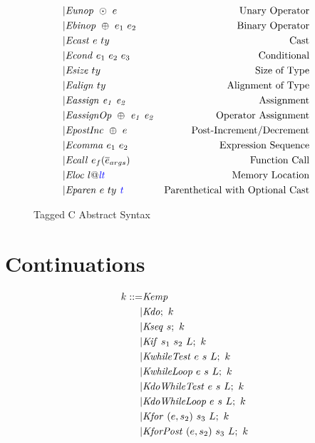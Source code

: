 \documentclass{llncs}
\begin{document}
\begin{figure}
\begin{subfigure}[t]{0.69\textwidth}
\[\begin{aligned}
    | & \mathit{Eunop} ~ \odot ~ e & \textnormal{Unary Operator} \\
    | & \mathit{Ebinop} ~ \oplus ~ e_1 ~ e_2 & \textnormal{Binary Operator} \\
    | & \mathit{Ecast} ~ e ~ ty & \textnormal{Cast} \\
    | & \mathit{Econd} ~ e_1 ~ e_2 ~ e_3 & \textnormal{Conditional} \\
    | & \mathit{Esize} ~ ty & \textnormal{Size of Type} \\
    | & \mathit{Ealign} ~ ty & \textnormal{Alignment of Type} \\
    | & \mathit{Eassign ~ e_1 ~ e_2} & \textnormal{Assignment} \\
    | & \mathit{EassignOp ~ \oplus ~ e_1 ~ e_2} & \textnormal{Operator Assignment} \\
    | & \mathit{EpostInc} ~ \oplus ~ e & \textnormal{Post-Increment/Decrement} \\
    | & \mathit{Ecomma} ~ e_1 ~ e_2 & \textnormal{Expression Sequence} \\
    | & \mathit{Ecall} ~ e_f(\overline{e}_{args}) & \textnormal{Function Call} \\
    | & \mathit{Eloc} ~ l@\mathit{\color{blue} lt} & \textnormal{Memory Location} \\
    | & \mathit{Eparen} ~ e ~ ty ~ \mathit{\color{blue} t} & \textnormal{Parenthetical with Optional Cast} \\
    \end{aligned}\]
  \end{subfigure}
  \caption{Tagged C Abstract Syntax}
  \label{fig:syntax}
\end{figure}

\section{Continuations}
\label{app:continuations}

\[\begin{split}
k ::= & \mathit{Kemp} \\
| & \mathit{Kdo};~ k \\
| & \mathit{Kseq} ~ s; ~ k \\
| & \mathit{Kif} ~ s_1 ~ s_2 ~ L; ~ k \\
| & \mathit{KwhileTest} ~ e ~ s ~ L; ~ k \\
| & \mathit{KwhileLoop} ~ e ~ s ~ L; ~ k \\
| & \mathit{KdoWhileTest} ~ e ~ s ~ L; ~ k \\
| & \mathit{KdoWhileLoop} ~ e ~ s ~ L; ~ k \\
| & \mathit{Kfor} ~ (e,s_2) ~ s_3 ~ L ; ~ k \\
| & \mathit{KforPost} ~ (e,s_2) ~ s_3 ~ L ; ~ k \\
\end{split}\]
\end{document}
